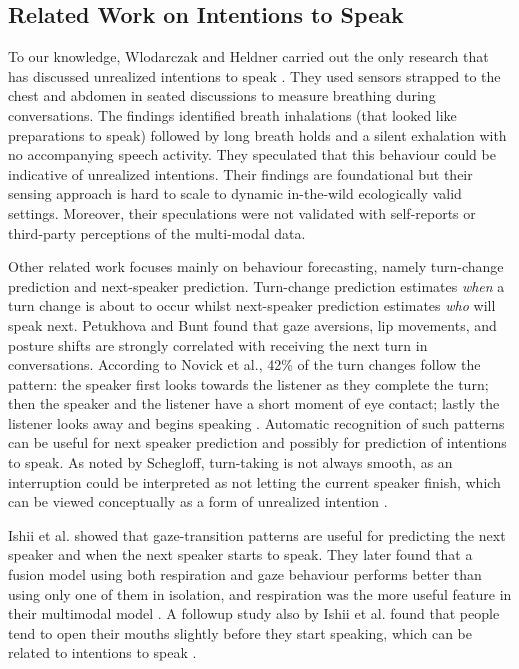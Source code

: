 \documentclass[manuscript,screen,review]{acmart}
\begin{document}
\subsection{Related Work on Intentions to Speak}
To our knowledge, Wlodarczak and Heldner carried out the only research that has discussed unrealized intentions to speak \cite{wlodarczak2020breathing}. They used sensors strapped to the chest and abdomen in seated discussions to measure breathing during conversations. The findings identified breath inhalations (that looked like preparations to speak) followed by long breath holds and a silent exhalation with no accompanying speech activity. They speculated that this behaviour could be indicative of unrealized intentions. Their findings are foundational but their sensing approach is hard to scale to dynamic in-the-wild ecologically valid settings. Moreover, their speculations were not validated with self-reports or third-party perceptions of the multi-modal data. 

Other related work focuses mainly on behaviour forecasting, namely turn-change prediction and next-speaker prediction. Turn-change prediction estimates \emph{when} a turn change is about to occur whilst next-speaker prediction estimates \emph{who} will speak next. Petukhova and Bunt \cite{whosnext} found that gaze aversions, lip movements, and posture shifts are strongly correlated with receiving the next turn in conversations. According to Novick et al., 42\% of the turn changes follow the pattern: the speaker first looks towards the listener as they complete the turn; then the speaker and the listener have a short moment of eye contact; lastly the listener looks away and begins speaking \cite{novick_gaze}. Automatic recognition of such patterns can be useful for next speaker prediction and possibly for prediction of intentions to speak. As noted by Schegloff, turn-taking is not always smooth, as an interruption could be interpreted as not letting the current speaker finish, which can be viewed conceptually as a form of unrealized intention \cite{schegloff2001accounts}.

Ishii et al. showed that gaze-transition patterns are useful for predicting the next speaker and when the next speaker starts to speak. They later found that a fusion model using both respiration and gaze behaviour performs better than using only one of them in isolation, and respiration was the more useful feature in their multimodal model \cite{ishii2015multimodal}. A followup study also by Ishii et al. found that people tend to open their mouths slightly before they start speaking, which can be related to intentions to speak \cite{mouth_open_patterns}. 
\end{document}

